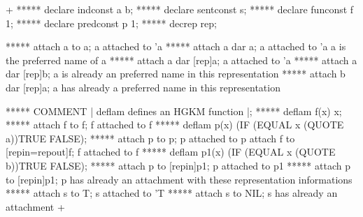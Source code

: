 \gfexample+
   ***** declare indconst a b;
   ***** declare sentconst s;
   ***** declare funconst f 1;
   ***** declare predconst p 1;
   ***** decrep rep;

   ***** attach a to a;
   a attached to 'a
   ***** attach a dar a;
   a attached to 'a
   a is the preferred name of a
   ***** attach a dar [rep]a;
   a attached to 'a
   ***** attach a dar [rep]b;
   a is already an preferred name in this representation
   ***** attach b dar [rep]a;
   a has already a preferred name in this representation

   ***** COMMENT | deflam defines an HGKM function |;
   ***** deflam f(x) x;
   ***** attach f to f;
   f attached to f
   ***** deflam p(x) (IF (EQUAL x (QUOTE a))TRUE FALSE);
   ***** attach p to p;
   p attached to p
   attach f to [repin=repout]f;
   f attached to f
   ***** deflam p1(x) (IF (EQUAL x (QUOTE b))TRUE FALSE);
   ***** attach p to [repin]p1;
   p attached to p1
   ***** attach p to [repin]p1;
   p has already an attachment with these representation informations
   ***** attach s to T;
   s attached to 'T
   ***** attach s to NIL;
   s has already an attachment
+
